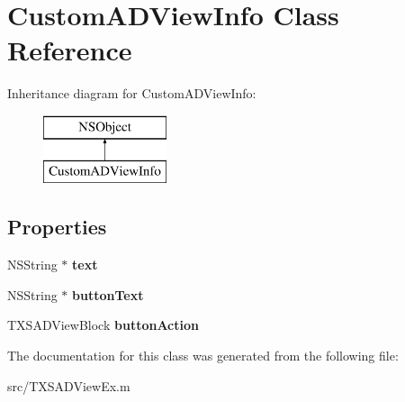 \hypertarget{interface_custom_a_d_view_info}{}\section{Custom\+A\+D\+View\+Info Class Reference}
\label{interface_custom_a_d_view_info}
Inheritance diagram for Custom\+A\+D\+View\+Info\+:\begin{figure}[H]
\begin{center}
\leavevmode
\includegraphics[height=2.000000cm]{interface_custom_a_d_view_info}
\end{center}
\end{figure}
\subsection*{Properties}
\begin{DoxyCompactItemize}
\item 
\hypertarget{interface_custom_a_d_view_info_aa26c7c419bca50856f6da0233b04d265}{}N\+S\+String $\ast$ {\bfseries text}\label{interface_custom_a_d_view_info_aa26c7c419bca50856f6da0233b04d265}

\item 
\hypertarget{interface_custom_a_d_view_info_a4c5595d45892a362cac9affb9492700b}{}N\+S\+String $\ast$ {\bfseries button\+Text}\label{interface_custom_a_d_view_info_a4c5595d45892a362cac9affb9492700b}

\item 
\hypertarget{interface_custom_a_d_view_info_af01d2cbf80ff9fcc47770cbf91eec0ce}{}T\+X\+S\+A\+D\+View\+Block {\bfseries button\+Action}\label{interface_custom_a_d_view_info_af01d2cbf80ff9fcc47770cbf91eec0ce}

\end{DoxyCompactItemize}


The documentation for this class was generated from the following file\+:\begin{DoxyCompactItemize}
\item 
src/T\+X\+S\+A\+D\+View\+Ex.\+m\end{DoxyCompactItemize}
